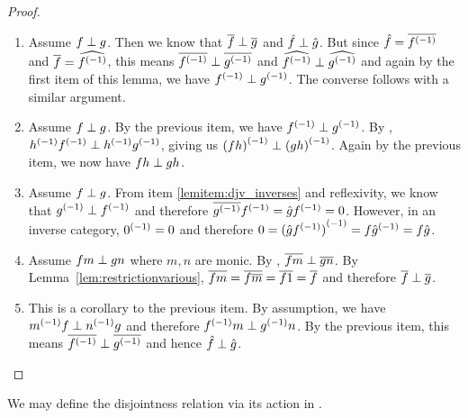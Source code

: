 \begin{proof}
  \prepprooflist
  \begin{enumerate}[{(}i{)}]
    \item Assume $f \perp g$. Then we know that $\overline{f} \perp \overline{g}$ and
      $\hat{f}\perp\hat{g}$. But since $\hat{f} = \overline{{f}^{(-1)}}$ and $\overline{f} = \widehat{{f}^{(-1)}}$, this
      means $\overline{{f}^{(-1)}} \perp \overline{{g}^{(-1)}}$ and $\widehat{{f}^{(-1)}}\perp\widehat{{g}^{(-1)}}$ and again
      by the first item of this lemma, we have ${f}^{(-1)} \perp {g}^{(-1)}$. The converse follows with
      a similar argument.
    \item Assume $f \perp g$. By the previous item, we have ${f}^{(-1)}\perp{g}^{(-1)}$. By
      , ${h}^{(-1)}{f}^{(-1)}\perp{h}^{(-1)}{g}^{(-1)}$, giving us ${(f h)}^{(-1)} \perp
      {(g h)}^{(-1)}$. Again by the previous item, we now have $f h \perp g h$.
    \item Assume $f \perp g$. From item \ref{lemitem:djv_inverses} and reflexivity, we know that
      ${g}^{(-1)}
      \perp {f}^{(-1)}$ and therefore $\overline{{g}^{(-1)}}{f}^{(-1)} = \hat{g}{f}^{(-1)}= 0$. However, in an
      inverse category, ${0}^{(-1)} = 0$ and therefore $0 = {(\hat{g}{f}^{(-1)})}^{(-1)} = f {\hat{g}}^{(-1)} = f
      \hat{g}$.
    \item Assume $f m \perp g n$ where $m, n$ are monic. By , $\overline{f m} \perp
      \overline{g n}$. By Lemma~\ref{lem:restrictionvarious}, $\overline{f m} = \overline{f \overline{m}} = \overline{f 1} =
      \overline{f}$ and therefore $\overline{f} \perp \overline{g}$.
    \item This is a corollary to the previous item. By assumption, we have ${m}^{(-1)} f \perp
      {n}^{(-1)}g$ and therefore ${f}^{(-1)}m \perp {g}^{(-1)} n$. By the previous item, this means
      $\overline{{f}^{(-1)}} \perp \overline{{g}^{(-1)}}$ and hence $\hat{f} \perp \hat{g}$.
  \end{enumerate}
\end{proof}

We may define the disjointness relation via its action in .

